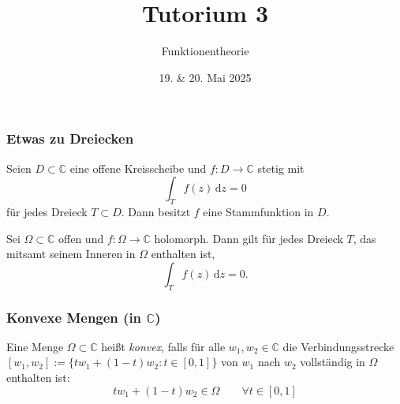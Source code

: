 \documentclass[10pt]{beamer}
\author[\url{https://fdf-uni.github.io/ft}]{}
\title{Tutorium 3}
\subtitle{\texorpdfstring{Funktionentheorie\vspace*{-1.5cm}}{Funktionentheorie}}
\date{19. \& 20. Mai 2025}
\begin{document}
\begin{frame}
	\titlepage
\end{frame}
\begin{frame}
	\frametitle{Etwas zu Dreiecken}
	\pause
	\begin{theorem}
		Seien $D \subset \mathbb{C}$ eine offene Kreisscheibe und $f \colon D \to \mathbb{C}$ stetig mit
		\[
			\int_T f(z) \,\mathrm{d}z = 0
		\]
		für jedes Dreieck $T \subset D$.
		Dann besitzt $f$ eine Stammfunktion in $D$.
	\end{theorem}
	\pause
	\begin{lemma}
		Sei $\Omega \subset \mathbb{C}$ offen und $f \colon \Omega \to \mathbb{C}$ holomorph.
		Dann gilt für jedes Dreieck $T$, das mitsamt seinem \glqq Inneren\grqq{} in $\Omega$ enthalten ist,
		\[
			\int_T f(z) \,\mathrm{d}z = 0.
		\]
	\end{lemma}
\end{frame}
\begin{frame}
	\frametitle{Konvexe Mengen (in $\mathbb{C}$)}
	\pause
	\begin{definition}
		Eine Menge $\Omega \subset \mathbb{C}$ heißt \emph{konvex}, falls für alle $w_1, w_2 \in \mathbb{C}$ die Verbindungsstrecke $[w_1, w_2] := \{t w_1 + (1 - t) w_2 : t \in [0, 1]\}$ von $w_1$ nach $w_2$ vollständig in $\Omega$ enthalten ist:
		\[
			t w_1 + (1 - t) w_2 \in \Omega \qquad \forall t \in [0, 1]
		\]
	\end{definition}
	\pause
	\begin{center}
	\end{center}
\end{frame}
\end{document}

